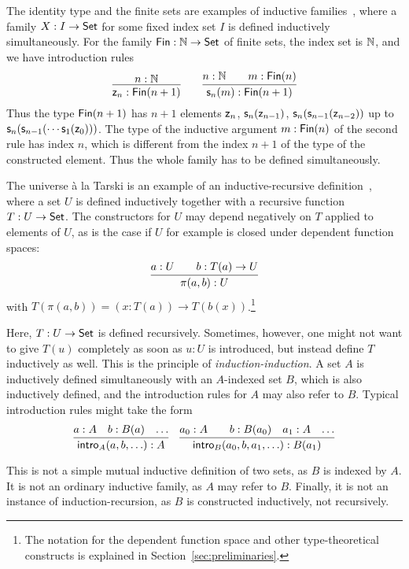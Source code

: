 \documentclass{article}
\begin{document}
The identity type and the finite sets are examples
of inductive families~\cite{dybjer1994indfam}, where a family $X : I
\to \mathsf{Set}$ for some fixed index set $I$ is defined inductively
simultaneously. For the family $\mathsf{Fin} : \mathbb{N} \to \mathsf{Set}$ of finite sets,
the index set is $\mathbb{N}$, and we have introduction rules
\[
\infer{\finzero{n} : \Fin(n + 1)}{n : \Nat} \qquad
\infer{\finsucc{n}{m} : \Fin(n + 1)}{n : \Nat & \quad m : \Fin(n)}
\]
Thus the type $\mathsf{Fin}(n+1)$ has $n + 1$ elements $\mathsf{z}_{n}$,
$\mathsf{s}_{n}(\mathsf{z}_{n-1})$,
$\mathsf{s}_{n}(\mathsf{s}_{n-1}(\mathsf{z}_{n-2}))$ up to
$\mathsf{s}_{n}(\mathsf{s}_{n-1}(\cdots\mathsf{s}_{1}(\mathsf{z}_{0})))$.
The type of the inductive argument $m : \mathsf{Fin}(n)$ of the second rule
has index $n$, which is different from the index $n + 1$ of the type
of the constructed element. Thus the whole family has to be defined
simultaneously.

The universe \`a la Tarski is an example of an inductive-recursive
definition~\cite{dybjer2000IR}, where a set $U$ is defined inductively
together with a recursive function $T : U \to \mathsf{Set}$.  The constructors
for $U$ may depend negatively on $T$ applied to elements of $U$, as is
the case if $U$ for example is closed under dependent function spaces:
\[
\infer{\pi(a, b) : U}{a : U & \quad b : T(a) \to U}
\]
with $T(\pi(a, b)) = (x : T(a)) \to T(b(x))$.\footnote{The notation
  for the dependent function space and other type-theoretical
  constructs is explained in Section~\ref{sec:preliminaries}.}

Here, $T : U \to \mathsf{Set}$ is defined recursively. Sometimes, however, one
might not want to give $T(u)$ completely as soon as $u : U$ is
introduced, but instead define $T$ inductively as well. This is the
principle of \emph{induction-induction}. A set $A$ is inductively
defined simultaneously with an $A$-indexed set $B$, which is also
inductively defined, and the introduction rules for $A$ may also refer
to $B$. Typical introduction rules might take the form
\[ \infer{\intro{A}(a, b, \ldots) : A}{a : A &b : B(a) & \ldots} \quad
\infer{\intro{B}(a_0, b, a_1, \ldots) : B(a_1)}{a_0 : A &
&b : B(a_0) & a_1 : A & \ldots} \]

This is not a simple mutual inductive definition of two sets, as $B$
is indexed by $A$. It is not an ordinary inductive family, as $A$ may
refer to $B$. Finally, it is not an instance of induction-recursion,
as $B$ is constructed inductively, not recursively.
\end{document}
